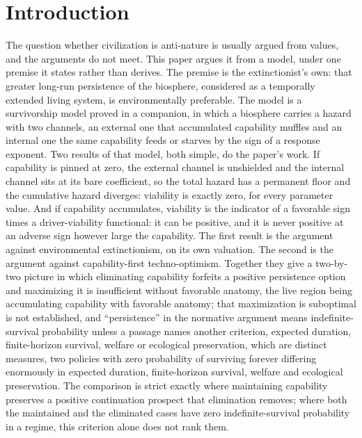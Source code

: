 \section{Introduction}\label{sec:intro}

The question whether civilization is anti-nature is usually argued from
values, and the arguments do not meet. This paper argues it from a
model, under one premise it states rather than derives. The premise is
the extinctionist's own: that greater long-run persistence of the
biosphere, considered as a temporally extended living system, is
environmentally preferable. The model is a survivorship model proved in
a companion, in which a biosphere carries a hazard with two channels, an
external one that accumulated capability muffles and an internal one the
same capability feeds or starves by the sign of a response exponent. Two
results of that model, both simple, do the paper's work. If capability
is pinned at zero, the external channel is unshielded and the internal
channel sits at its bare coefficient, so the total hazard has a
permanent floor and the cumulative hazard diverges: viability is
exactly zero, for every parameter value. And if capability accumulates,
viability is the indicator of a favorable sign times a driver-viability
functional: it can be positive, and it is never positive at an adverse
sign however large the capability. The first result is the argument
against environmental extinctionism, on its own valuation. The second
is the argument against capability-first techno-optimism. Together they give a two-by-two picture in which eliminating capability forfeits a positive persistence option and maximizing it is insufficient without favorable anatomy, the live region being accumulating capability with favorable anatomy; that maximization is suboptimal is not established, and ``persistence'' in the normative argument means indefinite-survival probability unless a passage names another criterion, expected duration, finite-horizon survival, welfare or ecological preservation, which are distinct measures, two policies with zero probability of surviving forever differing enormously in expected duration, finite-horizon survival, welfare and ecological preservation. The comparison is strict exactly where maintaining capability preserves a positive continuation prospect that elimination removes; where both the maintained and the eliminated cases have zero indefinite-survival probability in a regime, this criterion alone does not rank them.

